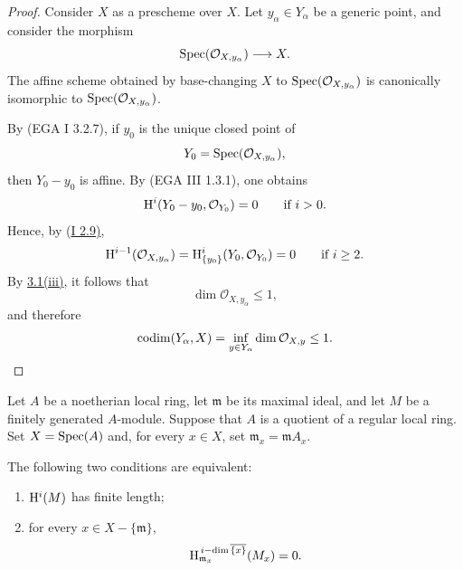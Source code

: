 \begin{proof}
Consider $X$ as a prescheme over $X$. Let $y_{\alpha}\in Y_{\alpha}$ be a
generic point, and consider the morphism
\[
  \operatorname{Spec}(\mathcal O_{X,y_{\alpha}})\longrightarrow X.
\]
The affine scheme obtained by base-changing $X$ to
$\operatorname{Spec}(\mathcal O_{X,y_{\alpha}})$ is canonically isomorphic to
$\operatorname{Spec}(\mathcal O_{X,y_{\alpha}})$.

By \textup{(EGA I 3.2.7)}, if $y_0$ is the unique closed point of
\[
  Y_0=\operatorname{Spec}(\mathcal O_{X,y_{\alpha}}),
\]
then $Y_0-y_0$ is affine. By \textup{(EGA III 1.3.1)}, one obtains
\[
  \mathrm H^i(Y_0-y_0,\mathcal O_{Y_0})=0\qquad\text{if }i>0.
\]
Hence, by \textup{(\hyperref[I.2.9]{I 2.9)}},
\[
  \mathrm H^{i-1}(\mathcal O_{X,y_{\alpha}})
  =\mathrm H^i_{\{y_0\}}(Y_0,\mathcal O_{Y_0})=0
  \qquad\text{if }i\geq 2.
\]
By \hyperref[V.3.1]{3.1\textup{(iii)}}, it follows that
\[
  \dim\mathcal O_{X,y_{\alpha}}\leq 1,
\]
and therefore
\[
  \operatorname{codim}(Y_{\alpha},X)
  =\inf_{y\in Y_{\alpha}}\dim\mathcal O_{X,y}\leq 1.
\]
\end{proof}

Let $A$ be a noetherian local ring, let $\mathfrak m$ be its
maximal ideal, and let $M$ be a finitely generated $A$-module. Suppose that
$A$ is a quotient of a regular local ring. Set $X=\operatorname{Spec}(A)$ and, for every
$x\in X$, set $\mathfrak m_x=\mathfrak m A_x$.

\begin{sgaproposition}
The following two conditions are equivalent:
\begin{enumerate}
  \item[(a)] $\mathrm H^i(M)$ has finite length;
  \item[(b)] for every $x\in X-\{\mathfrak m\}$,
  \[
    \mathrm H_{\mathfrak m_x}^{\,i-\dim\overline{\{x\}}}(M_x)=0.
  \]
\end{enumerate}
\end{sgaproposition}

